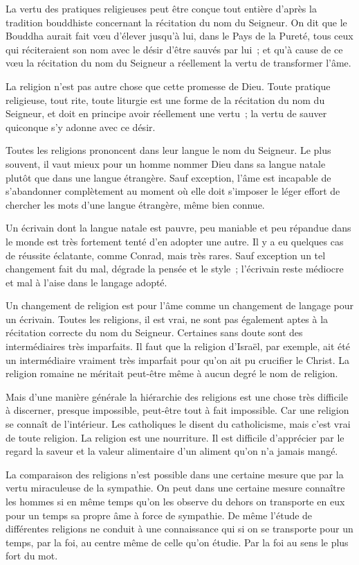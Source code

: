 \documentclass[french,twoside]{book} %
\begin{document}
La vertu des pratiques religieuses peut être conçue tout entière d'après la tradition bouddhiste concernant la récitation du nom du Seigneur. On dit que le Bouddha aurait fait vœu d'élever jusqu'à lui, dans le Pays de la Pureté, tous ceux qui réciteraient son nom avec le désir d'être sauvés par lui ; et qu'à cause de ce vœu la récitation du nom du Seigneur a réellement la vertu de transformer l'âme.\par
La religion n'est pas autre chose que cette promesse de Dieu. Toute pratique religieuse, tout rite, toute liturgie est une forme de la récitation du nom du Seigneur, et doit en principe avoir réellement une vertu ; la vertu de sauver quiconque s'y adonne avec ce désir.\par
Toutes les religions prononcent dans leur langue le nom du Seigneur. Le plus souvent, il vaut mieux pour un homme nommer Dieu dans sa langue natale plutôt que dans une langue étrangère. Sauf exception, l'âme est incapable de s'abandonner complètement au moment où elle doit s'imposer le léger effort de chercher les mots d'une langue étrangère, même bien connue.\par
Un écrivain dont la langue natale est pauvre, peu maniable et peu répandue dans le monde est très fortement tenté d'en adopter une autre. Il y a eu quelques cas de réussite éclatante, comme Conrad, mais très rares. Sauf exception un tel changement fait du mal, dégrade la pensée et le style ; l'écrivain reste médiocre et mal à l'aise dans le langage adopté.\par
Un changement de religion est pour l'âme comme un changement de langage pour un écrivain. Toutes les religions, il est vrai, ne sont pas également aptes à la récitation correcte du nom du Seigneur. Certaines sans doute sont des intermédiaires très imparfaits. Il faut que la religion d'Israël, par exemple, ait été un intermédiaire vraiment très imparfait pour qu'on ait pu crucifier le Christ. La religion romaine ne méritait peut-être même à aucun degré le nom de religion.\par
Mais d'une manière générale la hiérarchie des religions est une chose très difficile à discerner, presque impossible, peut-être tout à fait impossible. Car une religion se connaît de l'intérieur. Les catholiques le disent du catholicisme, mais c'est vrai de toute religion. La religion est une nourriture. Il est difficile d'apprécier par le regard la saveur et la valeur alimentaire d'un aliment qu'on n'a jamais mangé.\par
La comparaison des religions n'est possible dans une certaine mesure que par la vertu miraculeuse de la sympathie. On peut dans une certaine mesure connaître les hommes si en même temps qu'on les observe du dehors on transporte en eux pour un temps sa propre âme à force de sympathie. De même l'étude de différentes religions ne conduit à une connaissance qui si on se transporte pour un temps, par la foi, au centre même de celle qu'on étudie. Par la foi au sens le plus fort du mot.\par
\end{document}
